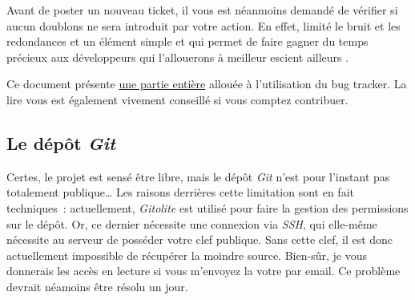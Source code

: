 Avant de poster un nouveau ticket, il vous est néanmoins demandé de vérifier si aucun doublons ne sera introduit par votre action.
En effet, limité le bruit et les redondances et un élément simple et qui permet de faire gagner du temps précieux aux développeurs qui l'allouerons à meilleur escient ailleurs \smiley.

Ce document présente \hyperref[sec:contribution_bt]{une partie entière} allouée à l'utilisation du bug tracker.
La lire vous est également vivement conseillé si vous comptez contribuer.

\subsection{Le dépôt \emph{Git}}
Certes, le projet est sensé être libre, mais le dépôt \emph{Git} n'est pour l'instant pas totalement publique\dots{}
Les raisons derrières cette limitation sont en fait techniques~: actuellement, \emph{Gitolite} est utilisé pour faire la gestion des permissions sur le dépôt.
Or, ce dernier nécessite une connexion via \emph{SSH}, qui elle-même nécessite au serveur de posséder votre clef publique.
Sans cette clef, il est donc actuellement impossible de récupérer la moindre source.
Bien-sûr, je vous donnerais les accès en lecture si vous m'envoyez la votre par email.
Ce problème devrait néamoins être résolu un jour.
